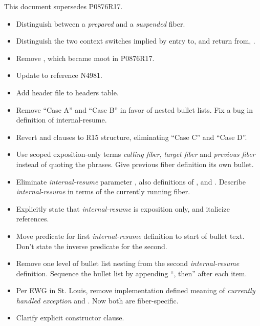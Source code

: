 \label{history}
This document supersedes P0876R17.


\begin{itemize}
    \item Distinguish between a \emph{prepared} and a \emph{suspended} fiber.
    \item Distinguish the two context switches implied by entry to, and return
          from, \resumewith.
    \item Remove , which became moot
          in P0876R17.
\end{itemize}


\begin{itemize}
    \item Update to reference N4981.
    \item Add  header file to headers table.
    \item Remove \resumewith ``Case A'' and ``Case B'' in favor of
          nested bullet lists. Fix a bug in definition of internal-resume.
    \item Revert \resumewith\xspace\returns and \except clauses to R15
          structure, eliminating ``Case C'' and ``Case D''.
    \item Use scoped exposition-only terms \emph{calling fiber}, \emph{target
          fiber} and \emph{previous fiber} instead of quoting the phrases.
          Give previous fiber definition its own bullet.
    \item Eliminate \emph{internal-resume} parameter , also
          definitions of , 
          and . Describe \emph{internal-resume} in
          terms of the currently running fiber.
    \item Explicitly state that \emph{internal-resume} is exposition only, and
          italicize references.
    \item Move predicate for first \emph{internal-resume} definition to start
          of bullet text. Don't state the inverse predicate for the second.
    \item Remove one level of bullet list nesting from the
          second \emph{internal-resume} definition. Sequence the bullet list
          by appending ``, then'' after each item.
    \item Per EWG in St. Louis, remove implementation defined meaning
          of \emph{currently handled exception} and .
          Now both are fiber-specific.
    \item Clarify explicit constructor \except clause.
\end{itemize}

